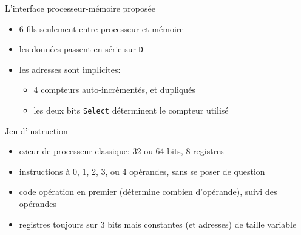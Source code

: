 \documentclass[slidetop,11pt,table]{beamer}
\begin{document}
\begin{frame}{L'interface processeur-mémoire proposée}
  \begin{figure}[b]
    \begin{center}
      \scalebox{0.9}{\proco}
    \end{center}
  \end{figure}
  \begin{itemize}
  \item 6 fils seulement entre processeur et mémoire
  \item les données passent en série sur \texttt{D}
  \item les adresses sont implicites:
    \begin{itemize}
    \item 4 compteurs auto-incrémentés, et dupliqués
    \item les deux bits \texttt{Select} déterminent le compteur utilisé
    \end{itemize}
  \end{itemize}
\end{frame}




\begin{frame}{Jeu d'instruction}
  \begin{itemize}
  \item c\o eur de processeur classique: 32 ou 64 bits, 8 registres
  \item instructions à 0, 1, 2, 3, ou 4 opérandes, sans se poser de question
  \item code opération en premier (détermine combien d'opérande), suivi des opérandes
  \item registres toujours sur 3 bits mais constantes (et adresses) de taille variable
  \end{itemize}
\end{frame}
\end{document}
